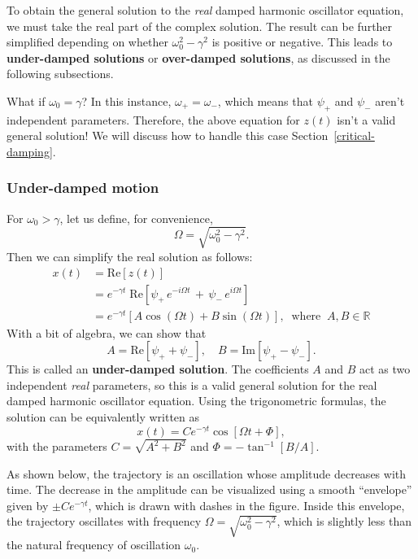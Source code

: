 \documentclass[10pt,a4paper]{article}
\begin{document}
To obtain the general solution to the \emph{real} damped harmonic
oscillator equation, we must take the real part of the complex
solution.  The result can be further simplified depending on whether
$\omega_0^2 - \gamma^2$ is positive or negative. This leads to
\textbf{under-damped solutions} or \textbf{over-damped solutions}, as
discussed in the following subsections.

What if $\omega_0 = \gamma$? In this instance, $\omega_+ = \omega_-$,
which means that $\psi_+$ and $\psi_-$ aren't independent
parameters. Therefore, the above equation for $z(t)$ isn't a valid
general solution! We will discuss how to handle this case
Section~\ref{critical-damping}.

\subsubsection{Under-damped motion}
\label{underdamped}

For $\omega_0 > \gamma$, let us define, for convenience,
\begin{equation}
  \Omega = \sqrt{\omega_0^2 - \gamma^2}.
\end{equation}
Then we can simplify the real solution as follows:
\begin{align}
  x(t) &= \mathrm{Re}\left[z(t)\right] \\
  &= e^{-\gamma t} \; \mathrm{Re}\left[\psi_+ \, e^{-i \Omega t}
    \,+\, \psi_- \, e^{i\Omega t}\right] \\
  &= e^{-\gamma t} \left[ A\cos\left(\Omega t\right)
    + B \sin\left(\Omega t\right)\right], \;\;\mathrm{where}\;\;
  A, B \in \mathbb{R}
  \label{underdamped-sol}
\end{align}
With a bit of algebra, we can show that
\begin{equation}
  A = \mathrm{Re}\left[\psi_+ + \psi_-\right], \quad
  B = \mathrm{Im}\left[\psi_+ - \psi_-\right].
\end{equation}
This is called an \textbf{under-damped solution}.  The coefficients
$A$ and $B$ act as two independent \emph{real} parameters, so this is
a valid general solution for the real damped harmonic oscillator
equation. Using the trigonometric formulas, the solution can be
equivalently written as
\begin{equation}
  x(t) = C e^{-\gamma t} \cos\left[\Omega t + \Phi\right],
\end{equation}
with the parameters $C = \sqrt{A^2 + B^2}$ and $\Phi = -
\tan^{-1}\left[B/A\right]$.

As shown below, the trajectory is an oscillation whose amplitude
decreases with time.  The decrease in the amplitude can be visualized
using a smooth ``envelope'' given by $\pm C e^{-\gamma t}$, which is
drawn with dashes in the figure. Inside this envelope, the trajectory
oscillates with frequency $\Omega = \sqrt{\omega_0^2 - \gamma^2}$,
which is slightly less than the natural frequency of oscillation
$\omega_0$.
\end{document}
